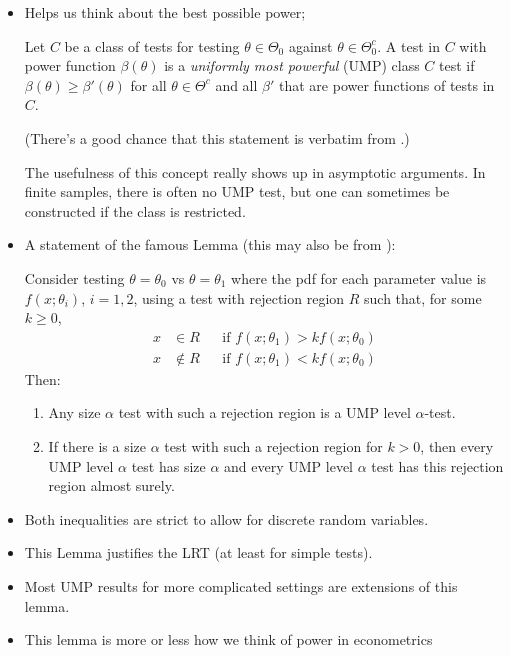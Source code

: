\begin{itemize}[leftmargin=0pt]

\item Helps us think about the best possible power;
  \begin{defn}
    Let $C$ be a class of tests for testing $\theta \in \Theta_0$
    against $\theta \in \Theta_0^c$.  A test in $C$ with power
    function $\beta(\theta)$ is a \emph{uniformly most powerful} (UMP)
    class $C$ test if $\beta(\theta) \geq \beta'(\theta)$ for all
    $\theta \in \Theta^c$ and all $\beta'$ that are power functions of
    tests in $C$.
  \end{defn}
  (There's a good chance that this statement is verbatim from
  \citealp{CB02}.)

  The usefulness of this concept really shows up in asymptotic
  arguments. In finite samples, there is often no UMP test, but one
  can sometimes be constructed if the class is restricted.

\item A statement of the famous Lemma (this may also be from
  \citealp{CB02}):
  \begin{thm}
    Consider testing $\theta = \theta_0$ vs $\theta = \theta_1$ where
    the pdf for each parameter value is $f(x; \theta_i)$, $i = 1,2$,
    using a test with rejection region $R$ such that, for some $k \geq
    0$,
    \begin{align*}
      x &\in R    &&\text{if } f(x; \theta_1) > k f(x; \theta_0) \\
      x &\notin R &&\text{if } f(x; \theta_1) < k f(x; \theta_0)
    \end{align*}
    Then:
    \begin{enumerate}
    \item Any size $\alpha$ test with such a rejection region is a UMP
      level $\alpha$-test.
    \item If there is a size $\alpha$ test with such a rejection
      region for $k > 0$, then every UMP level $\alpha$ test has size
      $\alpha$ and every UMP level $\alpha$ test has this rejection
      region almost surely.
    \end{enumerate}
  \end{thm}

\item Both inequalities are strict to allow for discrete random
  variables.

\item This Lemma justifies the LRT (at least for simple tests).

\item Most UMP results for more complicated settings are extensions of
  this lemma.

\item This lemma is more or less how we think of power in econometrics

\end{itemize}

